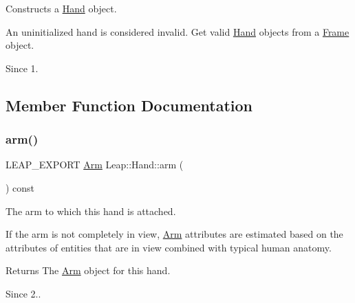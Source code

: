 Constructs a \hyperlink{class_leap_1_1_hand}{Hand} object.

An uninitialized hand is considered invalid. Get valid \hyperlink{class_leap_1_1_hand}{Hand} objects from a \hyperlink{class_leap_1_1_frame}{Frame} object.


\begin{DoxyCodeInclude}
\end{DoxyCodeInclude}


\begin{DoxySince}{Since}
1. 
\end{DoxySince}


\subsection{Member Function Documentation}
\mbox{\label{class_leap_1_1_hand_a6844547eb4a7ff6193fb0a052be93401}} 
\subsubsection{\texorpdfstring{arm()}{arm()}}
{\footnotesize\ttfamily L\+E\+A\+P\+\_\+\+E\+X\+P\+O\+RT \hyperlink{class_leap_1_1_arm}{Arm} Leap\+::\+Hand\+::arm (\begin{DoxyParamCaption}{ }\end{DoxyParamCaption}) const}

The arm to which this hand is attached.

If the arm is not completely in view, \hyperlink{class_leap_1_1_arm}{Arm} attributes are estimated based on the attributes of entities that are in view combined with typical human anatomy.


\begin{DoxyCodeInclude}
\end{DoxyCodeInclude}


\begin{DoxyReturn}{Returns}
The \hyperlink{class_leap_1_1_arm}{Arm} object for this hand. 
\end{DoxyReturn}
\begin{DoxySince}{Since}
2.. 
\end{DoxySince}
\mbox{\label{class_leap_1_1_hand_a967f114a0f3b394eb7e17777dcc06334}} 
